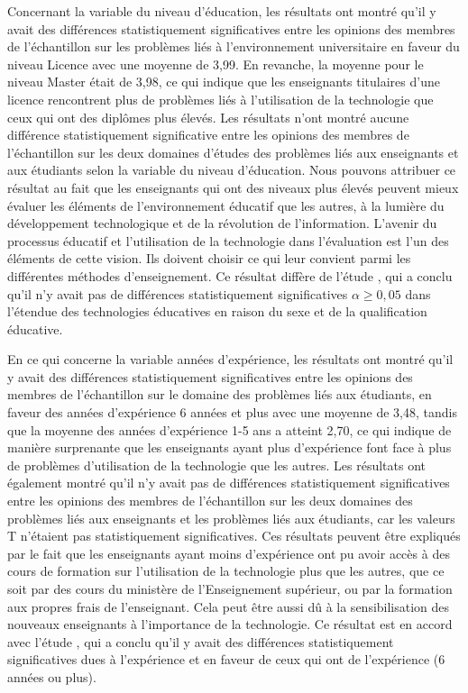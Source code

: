 \documentclass[french]{textolivre}
\begin{document}
Concernant la variable du niveau d’éducation, les résultats ont montré qu'il y avait des différences statistiquement significatives entre les opinions des membres de l'échantillon sur les problèmes liés à l'environnement universitaire en faveur du niveau Licence avec une moyenne de 3,99. En revanche, la moyenne pour le niveau Master était de 3,98, ce qui indique que les enseignants titulaires d'une licence rencontrent plus de problèmes liés à l'utilisation de la technologie que ceux qui ont des diplômes plus élevés. Les résultats n'ont montré aucune différence statistiquement significative entre les opinions des membres de l'échantillon sur les deux domaines d'études des problèmes liés aux enseignants et aux étudiants selon la variable du niveau d’éducation. Nous pouvons attribuer ce résultat au fait que les enseignants qui ont des niveaux plus élevés peuvent mieux évaluer les éléments de l'environnement éducatif que les autres, à la lumière du développement technologique et de la révolution de l'information. L'avenir du processus éducatif et l'utilisation de la technologie dans l'évaluation est l'un des éléments de cette vision. Ils doivent choisir ce qui leur convient parmi les différentes méthodes d'enseignement. Ce résultat diffère de l'étude \textcite{ahmed2007}, qui a conclu qu'il n'y avait pas de différences statistiquement significatives \(\alpha \geq 0,05\) dans l'étendue des technologies éducatives en raison du sexe et de la qualification éducative.

En ce qui concerne la variable années d'expérience, les résultats ont montré qu'il y avait des différences statistiquement significatives entre les opinions des membres de l'échantillon sur le domaine des problèmes liés aux étudiants, en faveur des années d'expérience 6 années et plus avec une moyenne de 3,48, tandis que la moyenne des années d'expérience 1-5 ans a atteint 2,70, ce qui indique de manière surprenante que les enseignants ayant plus d'expérience font face à plus de problèmes d'utilisation de la technologie que les autres. Les résultats ont également montré qu'il n'y avait pas de différences statistiquement significatives entre les opinions des membres de l'échantillon sur les deux domaines des problèmes liés aux enseignants et les problèmes liés aux étudiants, car les valeurs T n'étaient pas statistiquement significatives. Ces résultats peuvent être expliqués par le fait que les enseignants ayant moins d'expérience ont pu avoir accès à des cours de formation sur l'utilisation de la technologie plus que les autres, que ce soit par des cours du ministère de l'Enseignement supérieur, ou par la formation aux propres frais de l'enseignant. Cela peut être aussi dû à la sensibilisation des nouveaux enseignants à l'importance de la technologie. Ce résultat est en accord avec l'étude \textcite{ahmed2007}, qui a conclu qu'il y avait des différences statistiquement significatives dues à l'expérience et en faveur de ceux qui ont de l'expérience (6 années ou plus).
\end{document}
